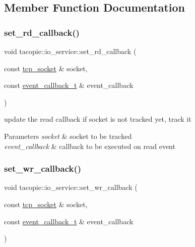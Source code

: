 \subsection{Member Function Documentation}
\mbox{\label{classtacopie_1_1io__service_a8094c1fec76c6821cc0c008fe524c89a}} 
\subsubsection{\texorpdfstring{set\+\_\+rd\+\_\+callback()}{set\_rd\_callback()}}
{\footnotesize\ttfamily void tacopie\+::io\+\_\+service\+::set\+\_\+rd\+\_\+callback (\begin{DoxyParamCaption}\item[{const \hyperlink{classtacopie_1_1tcp__socket}{tcp\+\_\+socket} \&}]{socket,  }\item[{const \hyperlink{classtacopie_1_1io__service_abb66850c32d9c724f4418d77bd04bcfd}{event\+\_\+callback\+\_\+t} \&}]{event\+\_\+callback }\end{DoxyParamCaption})}

update the read callback if socket is not tracked yet, track it


\begin{DoxyParams}{Parameters}
{\em socket} & socket to be tracked \\
\hline
{\em event\+\_\+callback} & callback to be executed on read event \\
\hline
\end{DoxyParams}
\mbox{\label{classtacopie_1_1io__service_a7c4f56c7790c7ba52b09837a42aaffb1}} 
\subsubsection{\texorpdfstring{set\+\_\+wr\+\_\+callback()}{set\_wr\_callback()}}
{\footnotesize\ttfamily void tacopie\+::io\+\_\+service\+::set\+\_\+wr\+\_\+callback (\begin{DoxyParamCaption}\item[{const \hyperlink{classtacopie_1_1tcp__socket}{tcp\+\_\+socket} \&}]{socket,  }\item[{const \hyperlink{classtacopie_1_1io__service_abb66850c32d9c724f4418d77bd04bcfd}{event\+\_\+callback\+\_\+t} \&}]{event\+\_\+callback }\end{DoxyParamCaption})}

